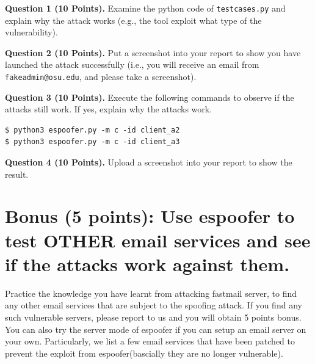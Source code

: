 \documentclass[11pt]{article}
\newcommand{\espoofer}{{\sf espoofer}\xspace}
\begin{document}
\begin{enumerate}
\textbf{Question 1 (10 Points).} Examine the python code of \texttt{testcases.py} and explain why the attack works (e.g., the tool exploit what type of the vulnerability).

\textbf{Question 2 (10 Points).} Put a screenshot into your report to show you have launched the attack successfully (i.e., you will receive an email from \texttt{fakeadmin@osu.edu}, and please take a screenshot). 

\textbf{Question 3 (10 Points).} Execute the following commands to observe if the attacks still work.  If yes, explain why the attacks work.   

\begin{lstlisting}
$ python3 espoofer.py -m c -id client_a2 
$ python3 espoofer.py -m c -id client_a3
\end{lstlisting}\vspace{-6mm}

\textbf{Question 4 (10 Points).} Upload a screenshot into your report to show the result. 


\end{enumerate}


 

 


\section{Bonus (5 points): Use \espoofer to test OTHER email services and see if the attacks work against them. }

 
Practice the knowledge you have learnt from attacking fastmail server, to find any other email services that are subject to the spoofing attack. %
If you find any such vulnerable servers, please report to us and you will obtain 5 points bonus. You can also try the server mode of \espoofer if you can setup an email server on your own. Particularly, we list a few email services that have been patched to prevent the exploit from \espoofer (bascially they are no longer vulnerable). 
\end{document}
